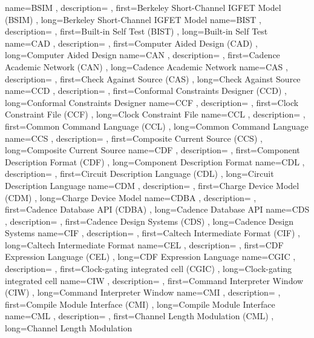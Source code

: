 { name={BSIM}
, description={}
, first={Berkeley Short-Channel IGFET Model (BSIM)}
, long={Berkeley Short-Channel IGFET Model}
}
{ name={BIST}
, description={}
, first={Built-in Self Test (BIST)}
, long={Built-in Self Test}
}
{ name={CAD}
, description={}
, first={Computer Aided Design (CAD)}
, long={Computer Aided Design}
}
{ name={CAN}
, description={}
, first={Cadence Academic Network (CAN)}
, long={Cadence Academic Network}
}
{ name={CAS}
, description={}
, first={Check Against Source (CAS)}
, long={Check Against Source}
}
{ name={CCD}
, description={}
, first={Conformal Constraints Designer (CCD)}
, long={Conformal Constraints Designer}
}
{ name={CCF}
, description={}
, first={Clock Constraint File (CCF)}
, long={Clock Constraint File}
}
{ name={CCL}
, description={}
, first={Common Command Language (CCL)}
, long={Common Command Language}
}
{ name={CCS}
, description={}
, first={Composite Current Source (CCS)}
, long={Composite Current Source}
}
{ name={CDF}
, description={}
, first={Component Description Format (CDF)}
, long={Component Description Format}
}
{ name={CDL}
, description={}
, first={Circuit Description Language (CDL)}
, long={Circuit Description Language}
}
{ name={CDM}
, description={}
, first={Charge Device Model (CDM)}
, long={Charge Device Model}
}
{ name={CDBA}
, description={}
, first={Cadence Database API (CDBA)}
, long={Cadence Database API}
}
{ name={CDS}
, description={}
, first={Cadence Design Systems (CDS)}
, long={Cadence Design Systems}
}
{ name={CIF}
, description={}
, first={Caltech Intermediate Format (CIF)}
, long={Caltech Intermediate Format}
}
{ name={CEL}
, description={}
, first={CDF Expression Language (CEL)}
, long={CDF Expression Language}
}
{ name={CGIC}
, description={}
, first={Clock-gating integrated cell (CGIC)}
, long={Clock-gating integrated cell}
}
{ name={CIW}
, description={}
, first={Command Interpreter Window (CIW)}
, long={Command Interpreter Window}
}
{ name={CMI}
, description={}
, first={Compile Module Interface (CMI)}
, long={Compile Module Interface}
}
{ name={CML}
, description={}
, first={Channel Length Modulation (CML)}
, long={Channel Length Modulation}
}
